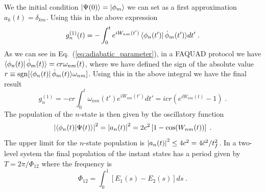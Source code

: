 \documentclass[a4paper,11pt]{article}
\begin{document}
We the initial condition $\ket{\Psi(0)}=\ket{\phi_m}$ we can set as a first approximation $a_k(t)=\delta_{km}$. Using this in the above expression
\begin{equation}
	g_n^{(1)}(t)=-\int_0^te^{iW_{nm}(t')}\bra{\phi_n(t')}\dot{\phi}_m(t')\rangle dt'\; .
\end{equation}
As we can see in Eq.~(\ref{eq:adiabatic_parameter}), in a FAQUAD protocol we have $\bra{\phi_n(t)}\dot{\phi}_m(t)\rangle=cr\omega_{nm}(t)$, where we have defined the sign of the absolute value $r\equiv \operatorname{sgn}[\bra{\phi_n(t)}\dot{\phi}_m(t)\rangle\omega_{nm}]$. Using this in the above integral we have the final result
\begin{equation}
	g_n^{(1)}=-cr\int_0^t\omega_{nm}(t')e^{iW_{nm}(t')}dt'=icr\left(e^{iW_{nm}(t)}-1\right)\; .
\end{equation}
The population of the $n$-state is then given by the oscillatory function
\begin{equation}
	\abs{\braket{\phi_n(t)}{\Psi(t)}}^2=\abs{a_n(t)}^2=2c^2\left[1-\cos(W_{nm}(t))\right]\; .
	\label{eq:amplitude_undesired_states}
\end{equation}
The upper limit for the $n$-state population is $\abs{a_n(t)}^2\leq4c^2=4\tilde{c}^2/t_f^2$. In a two-level system the final population of the instant states has a period given by $T=2\pi/\Phi_{12}$ where the frequency is
\begin{equation}
	\Phi_{12}=\int_0 ^1 [E_1(s)-E_2(s)]ds\; .
\end{equation}
\end{document}
